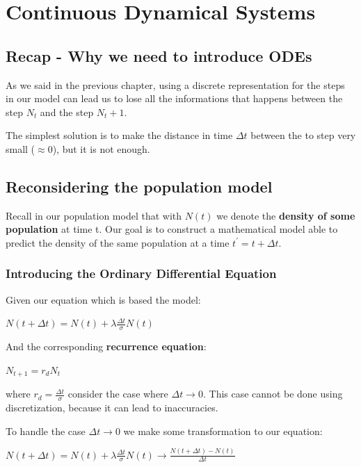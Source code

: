 \chapter{Continuous Dynamical Systems}

\section {Recap - Why we need to introduce ODEs}
As we said in the previous chapter, using a discrete representation for the steps in our model can lead us to lose all the informations that happens between the step $N_t$ and the step $N_t+1$. \par
The simplest solution is to make the distance in time $\Delta t$ between the to step very small ($\approx 0$), but it is not enough.

\section{Reconsidering the population model}
Recall in our population model that with $N(t)$ we denote the \textbf{density of some population} at time t. Our goal is to construct a mathematical model able to predict the density of the same population at a time $t^{'} = t + \Delta{t}$.

\subsection {Introducing the Ordinary Differential Equation}

\par Given our equation which is based the model:
\begin{center}
    $N(t + \Delta{t}) = N(t) + \lambda{\frac{\Delta{t}}{\sigma}{N(t)}}$
\end{center}
And the corresponding \textbf{recurrence equation}:
\begin{center}
    $N_{t+1} = r_{d}N_{t}$
\end{center}
where $r_{d} = \frac{\Delta{t}}{\sigma}$ consider the case where $\Delta{t} \rightarrow 0$. This case cannot be done using discretization, because it can lead to inaccuracies.
\par To handle the case $\Delta{t} \rightarrow 0$ we make some transformation to our equation:

\begin{center}
    $N(t + \Delta{t}) = N(t) + \lambda{\frac{\Delta{t}}{\sigma}{N(t)}} \rightarrow  \frac{N(t + \Delta{t}) - N(t)}{\Delta{t}} $
\end{center}

